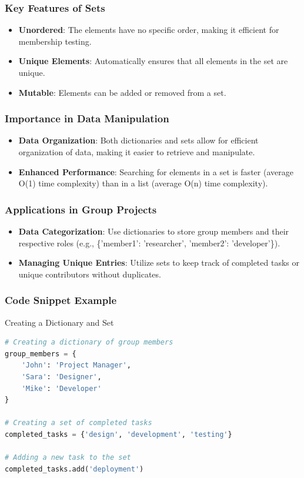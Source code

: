 \documentclass{beamer}
\begin{document}
\begin{frame}[fragile]
    \frametitle{Key Features of Sets}
    \begin{itemize}
        \item \textbf{Unordered}: The elements have no specific order, making it efficient for membership testing.
        \item \textbf{Unique Elements}: Automatically ensures that all elements in the set are unique.
        \item \textbf{Mutable}: Elements can be added or removed from a set.
    \end{itemize}
\end{frame}

\begin{frame}[fragile]
    \frametitle{Importance in Data Manipulation}
    \begin{itemize}
        \item \textbf{Data Organization}: Both dictionaries and sets allow for efficient organization of data, making it easier to retrieve and manipulate.
        \item \textbf{Enhanced Performance}: Searching for elements in a set is faster (average O(1) time complexity) than in a list (average O(n) time complexity).
    \end{itemize}
\end{frame}

\begin{frame}[fragile]
    \frametitle{Applications in Group Projects}
    \begin{itemize}
        \item \textbf{Data Categorization}: Use dictionaries to store group members and their respective roles (e.g., \{'member1': 'researcher', 'member2': 'developer'\}).
        \item \textbf{Managing Unique Entries}: Utilize sets to keep track of completed tasks or unique contributors without duplicates.
    \end{itemize}
\end{frame}

\begin{frame}[fragile]
    \frametitle{Code Snippet Example}
    \begin{block}{Creating a Dictionary and Set}
        \begin{lstlisting}[language=Python]
# Creating a dictionary of group members
group_members = {
    'John': 'Project Manager',
    'Sara': 'Designer',
    'Mike': 'Developer'
}

# Creating a set of completed tasks
completed_tasks = {'design', 'development', 'testing'}

# Adding a new task to the set
completed_tasks.add('deployment')
        \end{lstlisting}
    \end{block}
\end{frame}
\end{document}
